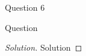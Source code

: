 \begin{solution}{Question 6}\label{ques:6}
    \begin{question}
    Question
    \end{question}
    \tcblower{}
    \begin{proof}[Solution]
        Solution
    \end{proof}
\end{solution}
